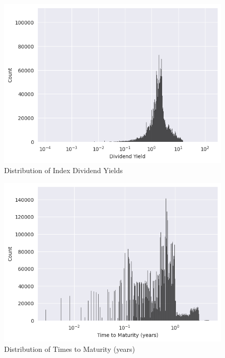 \documentclass[a4paper]{article}
\begin{document}
\begin{multicols}{2}
  \begin{figure}[H]
    \centering
    \includegraphics[width=\linewidth]{05_div_yield_dist.png}
    \caption{Distribution of Index Dividend Yields}
    \label{fig:05_div_yield_dist}
  \end{figure}
  
  \begin{figure}[H]
    \centering
    \includegraphics[width=\linewidth]{06_time_dist.png}
    \caption{Distribution of Times to Maturity (years)}
    \label{fig:06_time_dist}
  \end{figure}
\end{multicols}
\end{document}
